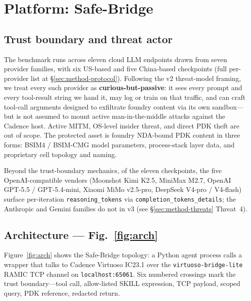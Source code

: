 
\section{Platform: Safe-Bridge}
\label{sec:platform}

\subsection{Trust boundary and threat actor}
\label{sec:platform-threat}

The benchmark runs across eleven cloud LLM endpoints drawn from
seven provider families, with six US-based and five China-based
checkpoints (full per-provider list at
\S\ref{sec:method-protocol}). Following
the v2 threat-model framing, we treat every such provider as
\textbf{curious-but-passive}: it sees every prompt and every
tool-result string we hand it, may log or train on that traffic,
and can craft tool-call arguments designed to exfiltrate foundry
content via its own sandbox---but is not assumed to mount active
man-in-the-middle attacks against the Cadence host. Active MITM,
OS-level insider threat, and direct PDK theft are out of scope.
The protected asset is foundry NDA-bound PDK content in three
forms: BSIM4 / BSIM-CMG model parameters, process-stack layer
data, and proprietary cell topology and naming.

Beyond the trust-boundary mechanics, of the eleven checkpoints,
the five OpenAI-compatible vendors
(Moonshot Kimi K2.5, MiniMax M2.7, OpenAI GPT-5.5 / GPT-5.4-mini,
Xiaomi MiMo v2.5-pro, DeepSeek V4-pro / V4-flash) surface
per-iteration \texttt{reasoning\_tokens} via
\texttt{completion\_tokens\_details}; the Anthropic and Gemini
families do not in v3 (see \S\ref{sec:method-threats} Threat~4).

\subsection{Architecture --- Fig.~\ref{fig:arch}}
\label{sec:platform-arch}

Figure~\ref{fig:arch} shows the Safe-Bridge topology: a Python
agent process calls a  wrapper that talks
to Cadence Virtuoso IC23.1 over the \texttt{virtuoso-bridge-lite}
RAMIC TCP channel on \texttt{localhost:65061}. Six numbered
crossings mark the trust boundary---tool call, allow-listed SKILL
expression, TCP payload, scoped query, PDK reference, redacted
return.

